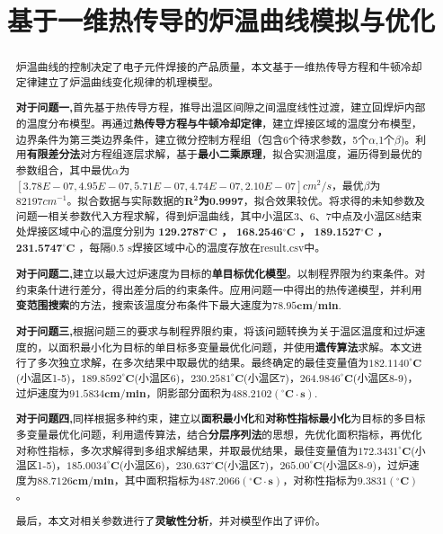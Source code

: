 \documentclass[withoutpreface,bwprint]{cumcmthesis} %
\title{基于一维热传导的炉温曲线模拟与优化}
\begin{document}
	\maketitle
	\begin{abstract}
		炉温曲线的控制决定了电子元件焊接的产品质量，本文基于一维热传导方程和牛顿冷却定律建立了炉温曲线变化规律的机理模型。
		
		\textbf{对于问题一,}首先基于热传导方程，推导出温区间隙之间温度线性过渡，建立回焊炉内部的温度分布模型。再通过\textbf{热传导方程与牛顿冷却定律}，建立焊接区域的温度分布模型，边界条件为第三类边界条件，建立微分控制方程组（包含6个待求参数，5个$\alpha$,1个$\beta$)。利用\textbf{有限差分法}对方程组逐层求解，基于\textbf{最小二乘原理}，拟合实测温度，遍历得到最优的参数组合，其中最优$\alpha$为$[3.78E-07, 4.95E-07 , 5.71E-07, 4.74E-07,  2.10E-07 ]cm^2/s$，最优$\beta$为$82197 cm^{-1}$。拟合数据与实际数据的\textbf{$\bm{R^2}$为0.9997}，拟合效果较优。将求得的未知参数及问题一相关参数代入方程求解，得到炉温曲线，其中小温区3、6、7中点及小温区8结束处焊接区域中心的温度分别为\textbf{	129.2787$\bm{^\circ C }$ ， 168.2546$\bm{^\circ C}$  ， 189.1527$\bm{^\circ C}$   ， 231.5747$\bm{^\circ C}$ }，每隔0.5 s焊接区域中心的温度存放在result.csv中。
		
		\textbf{对于问题二,}建立以最大过炉速度为目标的\textbf{单目标优化模型}。以制程界限为约束条件。对约束条什进行差分，得出差分后的约束条件。应用问题一中得出的热传递模型，并利用\textbf{变范围搜索}的方法，搜索该温度分布条件下最大速度为$\bm{78.95cm/min}$.
		
		\textbf{对于问题三,}根据问题三的要求与制程界限约東，将该问题转换为关于温区温度和过炉速度的，以面积最小化为目标的单目标多变量最优化问题，并使用\textbf{遗传算法}求解。本文进行了多次独立求解，在多次结果中取最优的结果。最终确定的最佳变量值为$\bm{182.1140^\circ C} $(小温区1-5)，$\bm{189.8592^\circ C }$(小温区6)，$\bm{230.2581^\circ C }$(小温区7)，$\bm{264.9846^\circ C} $(小温区8-9)，过炉速度为$\bm{91.5834cm/min}$，阴影部分面积为$\bm{488.2102(^\circ C \cdot s)}$.
		
		\textbf{对于问题四,}同样根据多种约束，建立以\textbf{面积最小化}和\textbf{对称性指标最小化}为目标的多目标多变量最优化问题，利用遗传算法，结合\textbf{分层序列法}的思想，先优化面积指标，再优化对称性指标，多次求解得到多组求解结果，并取最优结果，最佳变量值为$\bm{172.3431^\circ C }$(小温区1-5)，$\bm{185.0034^\circ C} $(小温区6)，$\bm{230.637^\circ C }$(小温区7)，$\bm{265.00^\circ C }$(小温区8-9)，过炉速度为$\bm{88.7126cm/min}$，其中面积指标为$\bm{487.2066(^\circ C \cdot s)}$，对称性指标为$\bm{9.3831(^\circ C )}$。
		
		最后，本文对相关参数进行了\textbf{灵敏性分析}，并对模型作出了评价。
		
		
		
	\end{abstract}
	
\end{document}
